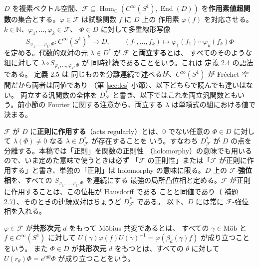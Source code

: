 \documentclass[11pt,a4paper]{article}
\newcommand{\Mob}{\mathrm{M\text{ö}b}}
\newcommand{\Circ}{S^{1}}
\newcommand{\Fields}{\mathcal{F}}
\newcommand{\Dom}{D}
\newcommand{\Dstar}{\Dom^{*}_{\Fields}}
\theoremstyle{definition}
\begin{document}
$\Dom$ を複素ベクトル空間、$\Fields \subseteq \operatorname{Hom}_\mathbb{C}(C^\infty(\Circ), \operatorname{End}(\Dom))$
を\textbf{作用素値超関数}の集合とする。$\varphi \in \Fields$ は試験関数 $f$ に $\Dom$ 上の
作用素 $\varphi(f)$ を対応させる。$k \in \mathbb{N}$、$\varphi_1, \dots, \varphi_k \in \Fields$、
$\Phi \in \Dom$ に対して多重線形写像
\[
  S_{\varphi_1,\dots,\varphi_k,\Phi} : C^\infty(\Circ)^k \to \Dom, \qquad
  (f_1,\dots,f_k) \mapsto \varphi_1(f_1)\cdots\varphi_k(f_k)\Phi
\]
を定める。代数的双対の元 $\lambda \in \Dom^*$ が $\Fields$ と\textbf{両立する}とは、
すべてのそのような組に対して $\lambda \circ S_{\varphi_1,\dots,\varphi_k,\Phi}$ が
同時連続であることをいう。これは \cite{T26} 定義 2.4 の語法である。\cite{CRTT25} 定義 2.5 は
同じものを分離連続で述べるが、$C^\infty(\Circ)$ が Fr\'echet 空間だから両者は同値であり
（第 \ref{sec:lcs} 小節）、以下どちらで読んでも違いはない。
両立する汎関数の全体を $\Dstar$ と書き、以下ではこれを両立汎関数ともいう。前小節の Fourier に関する注意から、両立する
$\lambda$ は単項式の組における値で決まる。

$\Fields$ が $\Dom$ に\textbf{正則に作用する}（acts regularly）とは、$0$ でない任意の
$\Phi \in \Dom$ に対して $\lambda(\Phi) \ne 0$ なる $\lambda \in \Dstar$ が存在することを
いう。すなわち $\Dstar$ が $\Dom$ の点を分離する。本稿では「正則」を関数の正則性
（holomorphy）の意味でも用いるので、いま定めた意味で使うときは必ず
「$\Fields$ の正則性」または「$\Fields$ が正則に作用する」と書き、単独の「正則」は
holomorphy の意味に限る。$\Dom$ 上の
$\Fields$-\textbf{強位相}を、すべての $S_{\varphi_1,\dots,\varphi_k,\Phi}$ を連続にする
最強の局所凸位相と定める。$\Fields$ が正則に作用することは、この位相が Hausdorff である
ことと同値であり（\cite{CRTT25} 補題 2.7）、そのときの連続双対はちょうど $\Dstar$ である。
以下、$\Dom$ には常に $\Fields$-強位相を入れる。

$\varphi \in \Fields$ が\textbf{共形次元} $d$ をもって M\"obius 共変であるとは、
すべての $\gamma \in \Mob$ と $f \in C^\infty(\Circ)$ に対して
$U(\gamma)\varphi(f)U(\gamma)^{-1} = \varphi(\beta_d(\gamma) f)$ が成り立つことをいう。
また $\Phi \in \Dom$ が\textbf{共形次元} $d$ をもつとは、すべての $\theta$ に対して
$U(r_\theta)\Phi = e^{id\theta}\Phi$ が成り立つことをいう。
\end{document}
